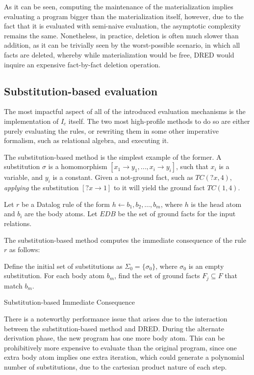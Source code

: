 \documentclass[sigconf,screen,review=false,natbib]{acmart}
\theoremstyle{definition}
\begin{document}
As it can be seen, computing the maintenance of the materialization implies evaluating a program bigger than the
materialization itself, however, due to the fact that it is evaluated with semi-naive evaluation, the asymptotic
complexity remains the same. Nonetheless, in practice, deletion is often much slower than addition, as it can be
trivially seen by the worst-possible scenario, in which all facts are deleted, whereby while materialization would
be free, DRED would inquire an expensive fact-by-fact deletion operation.
\subsection{Substitution-based evaluation}
The most impactful aspect of all of the introduced evaluation mechanisms is the implementation of $I_c$ itself. The two
most high-profile methods to do so are either purely evaluating the rules, or rewriting them in some other imperative
formalism, such as relational algebra, and executing it.

The substitution-based\cite{datalog} method is the simplest example of the former. A substitution $\sigma$ is
a homomorphism $[x_1 \rightarrow y_1, ..., x_i \rightarrow y_i]$, such that $x_i$ is a variable, and $y_i$ is
a constant. Given a not-ground fact, such as $TC(?x, 4)$, \textit{applying} the substitution $[?x \rightarrow 1]$ to
it will yield the ground fact $TC(1, 4)$.

Let $r$ be a Datalog rule of the form $h \leftarrow b_1, b_2, \ldots, b_m$, where $h$ is the head atom and $b_i$ are
the body atoms. Let $EDB$ be the set of ground facts for the input relations.

The substitution-based method computes the immediate consequence of the rule $r$ as follows:

Define the initial set of substitutions as $\Sigma_0 = \{ \sigma_0 \}$, where $\sigma_0$ is an empty substitution. For
each body atom $b_m$, find the set of ground facts $F_j \subseteq F$ that match $b_m$.
\begin{algorithm}
	\SetAlgoLined
	\caption{Substitution-based Immediate Consequence}
\end{algorithm}
There is a noteworthy performance issue that arises due to the interaction between the substitution-based method
and DRED. During the alternate derivation phase, the new program has one more body atom. This can be prohibitively
more expensive to evaluate than the original program, since one extra body atom implies one extra iteration, which
could generate a polynomial number of substitutions, due to the cartesian product nature of each step.
\end{document}
